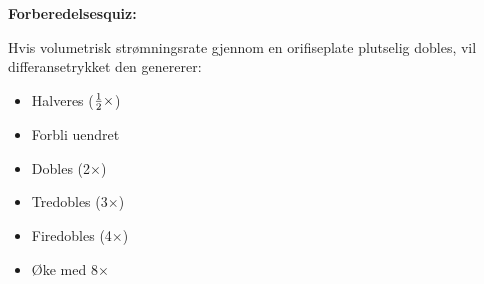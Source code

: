 \vfil \eject

\noindent
{\bf Forberedelsesquiz:}

Hvis volumetrisk strømningsrate gjennom en orifiseplate plutselig dobles, vil differansetrykket den genererer:

\begin{itemize}
\item{} Halveres (${1 \over 2} \times$)
\vskip 5pt
\item{} Forbli uendret
\vskip 5pt
\item{} Dobles (2$\times$)
\vskip 5pt
\item{} Tredobles (3$\times$)
\vskip 5pt
\item{} Firedobles (4$\times$)
\vskip 5pt
\item{} Øke med 8$\times$
\end{itemize}






